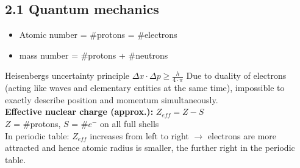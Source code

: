 \subsection{2.1 Quantum mechanics}
    \begin{itemize}
        \itemsep0em
            \item Atomic number = \#protons = \#electrons
            \item mass number = \#protons + \#neutrons
        \end{itemize}
        Heisenbergs uncertainty principle $\Delta x \cdot \Delta p \geq \frac{h}{4 \cdot \pi}$ Due to duality of electrons (acting like waves and elementary entities at the same time), impossible to exactly describe position and momentum simultaneously.\\
        \textbf{Effective nuclear charge (approx.):}   $Z_{eff} = Z-S$\\
        $Z$ = \#protons, $S$ = \#$e^-$ on all full shells
        \vspace{1mm}\\
        In periodic table: $Z_{eff}$ increases from left to right $\rightarrow$ electrons are more attracted and hence atomic radius is smaller, the further right in the periodic table.
        \vspace*{0.0em}